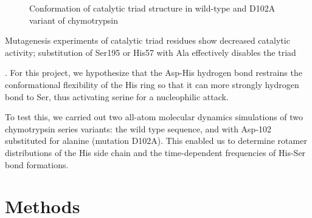 \documentclass[12pt, twocolumn]{article}
\newcommand*{\nolink}[1]{%
\begin{NoHyper}#1\end{NoHyper}%
}
\begin{document}
\begin{figure}[H]

    \caption{Conformation of catalytic triad structure in wild-type and D102A
    variant of chymotrypsin}\label{fig:triad}
\end{figure}

Mutagenesis experiments of catalytic
triad residues show decreased catalytic activity; substitution of Ser195 or
His57 with Ala effectively disables the triad~\nolink{\cite{hedstrom02}}. For
this project, we hypothesize that the Asp-His hydrogen bond restrains the
conformational flexibility of the His ring so that it can more strongly
hydrogen bond to Ser, thus activating serine for a nucleophilic attack.

To test this, we carried out two all-atom molecular dynamics simulations of
two chymotrypsin series variants: the wild type sequence, and with Asp-102
substituted for alanine (mutation D102A). This enabled us to determine rotamer
distributions of the His side chain and the time-dependent frequencies of
His-Ser bond formations.

\section{Methods}
\end{document}
